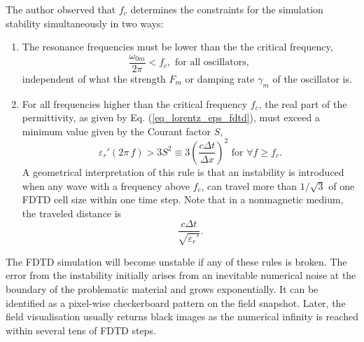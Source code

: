 The author observed that $f_c$ determines the constraints for the simulation stability simultaneously in two ways:
\begin{enumerate}
 \item{The resonance frequencies must be lower than the the critical frequency,  %
\begin{equation} \frac{\omega_{0m}}{2\pi} < f_c, \text{ for all oscillators, } %
\end{equation}
independent of what the strength $F_m$ or damping rate $\gamma_m$ of the oscillator is. 
} 
 \item{For all frequencies higher than the critical frequency $f_c$, the real part of the permittivity, as given by Eq. (\ref{eq_lorentz_eps_fdtd}), must exceed a minimum value given by the Courant factor $S$,
\begin{equation} \varepsilon_r'(2\pi\,f) > 3 S^{2} \equiv 3 \left( \frac{c \Delta t}{\Delta x} \right)^{2} \text{ for } \forall f \geq f_c. \label{eq_fdtd_stability_realp}\end{equation}  } %
A geometrical interpretation of this rule is that an instability is introduced when any wave with a frequency above $f_c$, can travel more than $1/\sqrt{3}$ of one FDTD cell size within one time step. 
Note that in a nonmagnetic medium, the traveled distance is $$\frac{c\Delta t}{\sqrt{\varepsilon_r'}}.$$
\end{enumerate}
The FDTD simulation will become unstable if any of these rules is broken. The error from the instability initially arises from an inevitable numerical noise at the boundary of the problematic material and grows exponentially. It can be identified as a pixel-wise checkerboard pattern on the field snapshot. Later, the field visualisation usually returns black images as the numerical infinity is reached within several tens of FDTD steps. 

